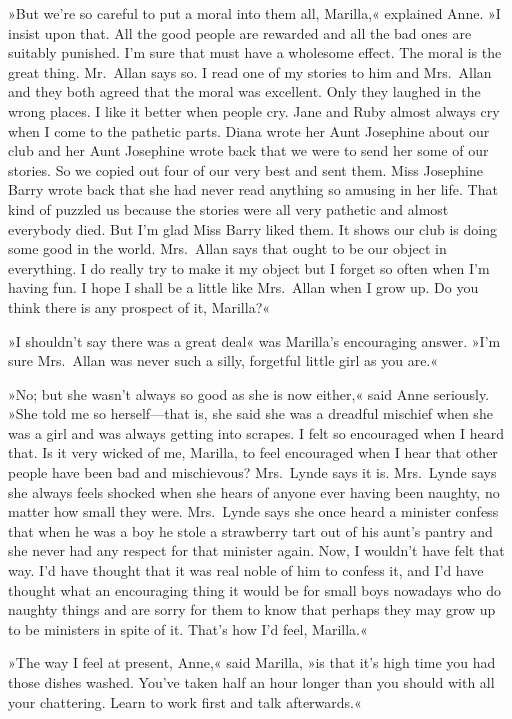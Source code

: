 »But we're so careful to put a moral into them all, Marilla,« explained Anne. »I insist upon that. All the good people are rewarded and all the bad ones are suitably punished. I'm sure that must have a wholesome effect. The moral is the great thing. Mr.~Allan says so. I read one of my stories to him and Mrs.~Allan and they both agreed that the moral was excellent. Only they laughed in the wrong places. I like it better when people cry. Jane and Ruby almost always cry when I come to the pathetic parts. Diana wrote her Aunt Josephine about our club and her Aunt Josephine wrote back that we were to send her some of our stories. So we copied out four of our very best and sent them. Miss Josephine Barry wrote back that she had never read anything so amusing in her life. That kind of puzzled us because the stories were all very pathetic and almost everybody died. But I'm glad Miss Barry liked them. It shows our club is doing some good in the world. Mrs.~Allan says that ought to be our object in everything. I do really try to make it my object but I forget so often when I'm having fun. I hope I shall be a little like Mrs.~Allan when I grow up. Do you think there is any prospect of it, Marilla?«

»I shouldn't say there was a great deal« was Marilla's encouraging answer. »I'm sure Mrs.~Allan was never such a silly, forgetful little girl as you are.«

»No; but she wasn't always so good as she is now either,« said Anne seriously. »She told me so herself—that is, she said she was a dreadful mischief when she was a girl and was always getting into scrapes. I felt so encouraged when I heard that. Is it very wicked of me, Marilla, to feel encouraged when I hear that other people have been bad and mischievous? Mrs.~Lynde says it is. Mrs.~Lynde says she always feels shocked when she hears of anyone ever having been naughty, no matter how small they were. Mrs.~Lynde says she once heard a minister confess that when he was a boy he stole a strawberry tart out of his aunt's pantry and she never had any respect for that minister again. Now, I wouldn't have felt that way. I'd have thought that it was real noble of him to confess it, and I'd have thought what an encouraging thing it would be for small boys nowadays who do naughty things and are sorry for them to know that perhaps they may grow up to be ministers in spite of it. That's how I'd feel, Marilla.«

»The way I feel at present, Anne,« said Marilla, »is that it's high time you had those dishes washed. You've taken half an hour longer than you should with all your chattering. Learn to work first and talk afterwards.«